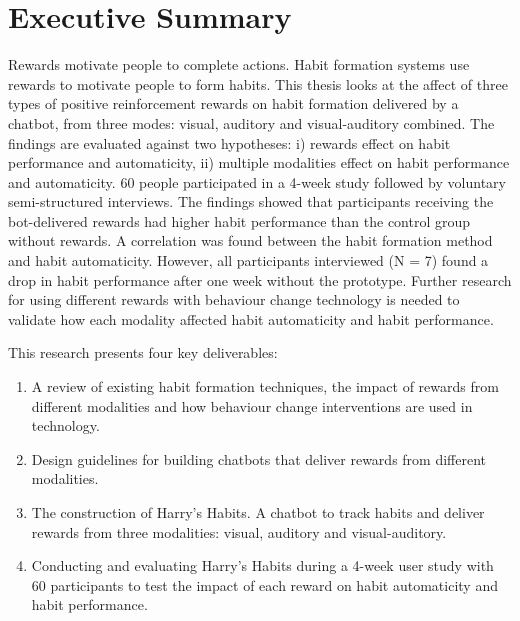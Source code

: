 
\section*{Executive Summary}
Rewards motivate people to complete actions. Habit formation systems use rewards to motivate people to form habits. This thesis looks at the affect of three types of positive reinforcement rewards on habit formation delivered by a chatbot, from three modes: visual, auditory and visual-auditory combined. The findings are evaluated against two hypotheses: i) rewards effect on habit performance and automaticity, ii) multiple modalities effect on habit performance and automaticity. 60 people participated in a 4-week study followed by voluntary semi-structured interviews. The findings showed that participants receiving the bot-delivered rewards had higher habit performance than the control group without rewards. A correlation was found between the habit formation method and habit automaticity. However, all participants interviewed (N = 7) found a drop in habit performance after one week without the prototype. Further research for using different rewards with behaviour change technology is needed to validate how each modality affected habit automaticity and habit performance.


This research presents four key deliverables:

\begin{enumerate}
  \item A review of existing habit formation techniques, the impact of rewards from different modalities and how behaviour change interventions are used in technology.
  \item Design guidelines for building chatbots that deliver rewards from different modalities.
  \item The construction of Harry's Habits. A chatbot to track habits and deliver rewards from three modalities: visual, auditory and visual-auditory.
  \item Conducting and evaluating Harry's Habits during a 4-week user study with 60 participants to test the impact of each reward on habit automaticity and habit performance.
\end{enumerate}

\newpage



